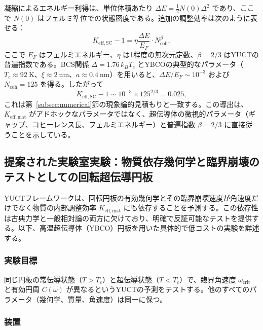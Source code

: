 \documentclass[12pt,a4paper]{article}
\begin{document}
	凝縮によるエネルギー利得は、単位体積あたり \(\Delta E = \frac{1}{2} N(0) \Delta^2\) であり、ここで \(N(0)\) はフェルミ準位での状態密度である。追加の調整効率は次のように表せる：
	\[
	K_{\mathrm{eff,SC}} - 1 = \eta \frac{\Delta E}{E_F} \cdot N_{\text{coh}}^{\beta},
	\]
	ここで \(E_F\) はフェルミエネルギー、\(\eta\) は1程度の無次元定数、\(\beta = 2/3\) はYUCTの普遍指数である。BCS関係 \(\Delta = 1.76 \, k_B T_c\) とYBCOの典型的なパラメータ（\(T_c \approx 92\ \text{K}\)、\(\xi \approx 2\ \text{nm}\)、\(a \approx 0.4\ \text{nm}\)）を用いると、\(\Delta E/E_F \sim 10^{-3}\) および \(N_{\text{coh}} = 125\) を得る。したがって
	\[
	K_{\mathrm{eff,SC}} - 1 \sim 10^{-3} \times 125^{2/3} = 0.025,
	\]
	これは第~\ref{subsec:numerical}節の現象論的見積もりと一致する。この導出は、\(K_{\mathrm{eff,mat}}\) がアドホックなパラメータではなく、超伝導体の微視的パラメータ（ギャップ、コヒーレンス長、フェルミエネルギー）と普遍指数 \(\beta = 2/3\) に直接従うことを示している。
	
	\subsection{提案された実験室実験：物質依存幾何学と臨界崩壊のテストとしての回転超伝導円板}
	
	YUCTフレームワークは、回転円板の有効幾何学とその臨界崩壊速度が角速度だけでなく物質の内部調整効率 \(K_{\mathrm{eff,mat}}\) にも依存することを予測する。この依存性は古典力学と一般相対論の両方に欠けており、明確で反証可能なテストを提供する。以下、高温超伝導体（YBCO）円板を用いた具体的で低コストの実験を詳述する。
	
	\subsubsection{実験目標}
	
	同じ円板の常伝導状態（\(T > T_c\)）と超伝導状態（\(T < T_c\)）で、臨界角速度 \(\omega_{\text{crit}}\) と有効円周 \(C(\omega)\) が異なるというYUCTの予測をテストする。他のすべてのパラメータ（幾何学、質量、角速度）は同一に保つ。
	
	\subsubsection{装置}
	
\end{document}
